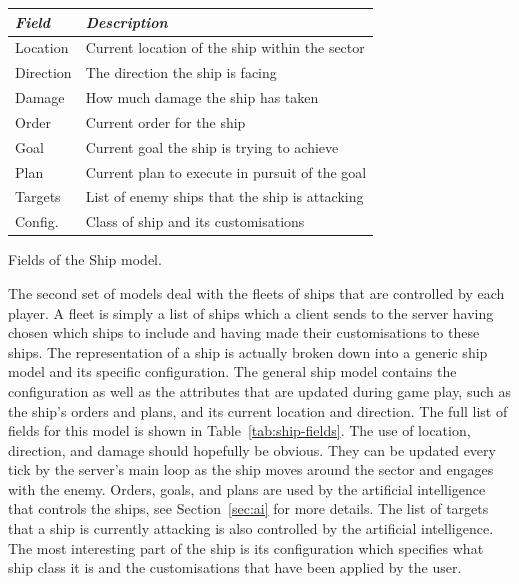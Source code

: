 \begin{margintable}
    \begin{tabular}{p{4em} p{11em}}
    \toprule
    \emph{Field} & \emph{Description} \\
    \midrule
    Location & Current location of the ship within the sector \\
    Direction & The direction the ship is facing \\
    Damage & How much damage the ship has taken \\
    Order & Current order for the ship \\
    Goal & Current goal the ship is trying to achieve \\
    Plan & Current plan to execute in pursuit of the goal \\
    Targets & List of enemy ships that the ship is attacking \\
    Config. & Class of ship and its customisations \\
    \bottomrule
    \end{tabular}
    \vspace{1em}
    \caption[Fields of the Ship model]{Fields of the Ship model.}
    \label{tab:ship-fields}
\end{margintable}

The second set of models deal with the fleets of ships that are controlled by each player. A fleet is simply a list of ships which a client sends to the server having chosen which ships to include and having made their customisations to these ships. The representation of a ship is actually broken down into a generic ship model and its specific configuration. The general ship model contains the configuration as well as the attributes that are updated during game play, such as the ship's orders and plans, and its current location and direction. The full list of fields for this model is shown in Table~\ref{tab:ship-fields}. The use of location, direction, and damage should hopefully be obvious. They can be updated every tick by the server's main loop as the ship moves around the sector and engages with the enemy. Orders, goals, and plans are used by the artificial intelligence that controls the ships, see Section~\ref{sec:ai} for more details. The list of targets that a ship is currently attacking is also controlled by the artificial intelligence. The most interesting part of the ship is its configuration which specifies what ship class it is and the customisations that have been applied by the user.

